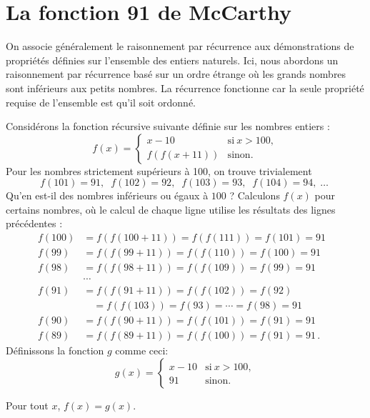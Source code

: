 \section{La fonction 91 de McCarthy}\label{s.induction-mccarthy}


On associe généralement le raisonnement par  récurrence aux démonstra\-tions  de propriétés définies sur l'ensemble des entiers naturels. Ici, nous abordons un raisonnement par  récurrence basé sur un ordre étrange où les grands nombres sont inférieurs aux petits nombres. La récurrence fonctionne car la seule propriété requise de l'ensemble est qu'il soit ordonné.

Considérons la fonction récursive suivante définie sur les nombres entiers :
\[
f(x) = \left \{\begin{array}{ll}
x-10 & \mathrm{si}\  x > 100, \\
f(f(x+11)) & \mathrm{sinon}.
\end{array}
\right.
\]
Pour les nombres strictement supérieurs à 100, on trouve trivialement
\[
f(101) = 91, \;\; f(102) = 92,\;\; f(103) = 93,\;\; f(104) = 94,\;\ldots\;
\]
Qu'en est-il des nombres inférieurs ou égaux à $100$ ? Calculons $f(x)$ pour certains nombres, où le calcul de chaque ligne utilise les résultats des lignes précédentes :
\begin{align*}
f(100) &= f(f(100+11)) = f(f(111)) = f(101) = 91\\
f(99) &= f(f(99+11)) = f(f(110)) = f(100) = 91\\
f(98) &= f(f(98+11)) = f(f(109)) = f(99) = 91\\
&\cdots&\\
f(91) &= f(f(91+11)) = f(f(102)) = f(92)\\
& \quad = f(f(103)) = f(93) = \cdots =f(98) = 91\\
f(90) &= f(f(90+11)) = f(f(101)) = f(91) = 91\\
f(89) &= f(f(89+11)) = f(f(100)) = f(91) = 91\,.
\end{align*}
Définissons la fonction $g$ comme ceci:
\[
g(x) = \left \{\begin{array}{ll}
x-10 & \mathrm{si}\  x > 100, \\
91 & \mathrm{sinon}.
\end{array}
\right.
\]

\begin{theorem}
Pour tout $x$, $f(x) = g(x)$.
\end{theorem}

